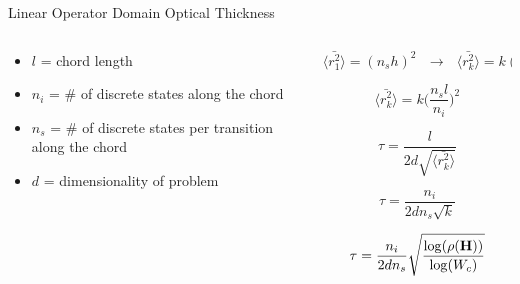 \documentclass{beamer}
\begin{document}
\begin{frame}{Linear Operator Domain Optical Thickness}

  \begin{columns}

    \begin{column}{0.5\textwidth}

      \begin{itemize}
      \item $l$ = chord length
        \bigskip
      \item $n_i$ = \# of discrete states along the chord
        \bigskip
      \item $n_s$ = \# of discrete states per transition along the chord
        \bigskip
      \item $d$ = dimensionality of problem
      \end{itemize}

    \end{column}

    \begin{column}{0.5\textwidth}

      \[
      \langle \bar{r_1^2} \rangle = (n_s h)^2 \ \ \ \rightarrow
      \ \ \ \langle \bar{r_k^2} \rangle = k (n_s h)^2
      \]

      \[
      \langle \bar{r_k^2} \rangle = k \Bigg(\frac{n_s l}{n_i}\Bigg)^2
      \]

      \[
      \tau = \frac{l}{2 d \sqrt{\langle \bar{r_k^2} \rangle}}
      \]

      \[
      \tau = \frac{n_i}{2 d n_s \sqrt{k}}
      \]

      \[
      \tau = \frac{n_i}{2 d n_s}
      \sqrt{\frac{\log(\rho(\mathbf{H}))}{\log(W_c)}}
      \]

    \end{column}


  \end{columns}

\end{frame}
\end{document}
